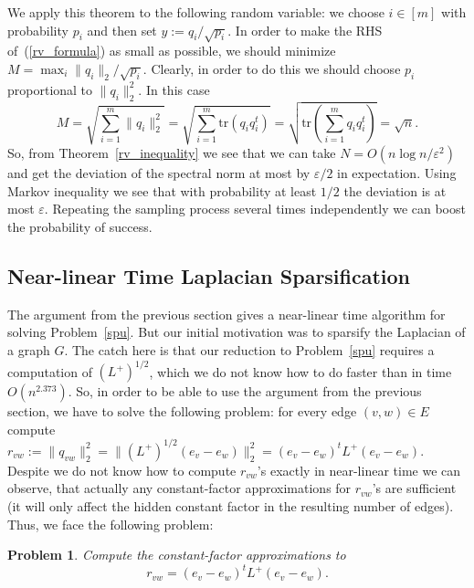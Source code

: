 \documentclass[12pt]{article}
\newcommand{\eps}{\varepsilon}
\newtheorem{problem}{Problem}
\begin{document}
    We apply this theorem to the following random variable: we choose $i \in [m]$
    with probability $p_i$ and then set $y := q_i / \sqrt{p_i}$.
    In order to make the RHS of~(\ref{rv_formula}) as small as possible, we should
    minimize $M = \max_i \|q_i\|_2 / \sqrt{p_i}$. Clearly, in order to do this
    we should choose $p_i$ proportional to $\|q_i\|_2^2$.
    In this case
    $$
        M = \sqrt{\sum_{i=1}^m \|q_i\|_2^2} =
        \sqrt{\sum_{i=1}^m \mathrm{tr}(q_i q_i^t)} =
        \sqrt{\mathrm{tr}\left(\sum_{i=1}^m q_i q_i^t\right)} = \sqrt{n}.
    $$
    So, from Theorem~\ref{rv_inequality} we see that we can take $N = O(n \log n / \eps^2)$
    and get the deviation of the spectral norm at most by $\eps / 2$ in expectation.
    Using Markov inequality we see that with probability at least $1/2$ the deviation
    is at most $\eps$. Repeating the sampling process several times independently
    we can boost the probability of success.

    \subsection{Near-linear Time Laplacian Sparsification}

    The argument from the previous section gives a near-linear time algorithm for solving
    Problem~\ref{spu}. But our initial motivation was to sparsify the Laplacian of a graph
    $G$. The catch here is that our reduction to Problem~\ref{spu} requires a computation
    of $(L^+)^{1/2}$, which we do not know how to do faster than in time $O(n^{2.373})$.
    So, in order to be able to use the argument from the previous section, we have to solve
    the following problem: for every edge $(v, w) \in E$ compute
    $r_{vw} := \|q_{vw}\|_2^2 =
    \|(L^+)^{1/2}(e_v - e_w)\|_2^2 = (e_v - e_w)^t L^+ (e_v - e_w)$.
    Despite we do not know how to compute $r_{vw}$'s exactly in near-linear time we can
    observe, that actually any constant-factor approximations for $r_{vw}$'s are sufficient
    (it will only affect the hidden constant factor in the resulting number of edges).
    Thus, we face the following problem:
    \begin{problem}
        Compute the constant-factor approximations to
        $$
            r_{vw} = (e_v - e_w)^t L^+ (e_v - e_w).
        $$
    \end{problem}
\end{document}
